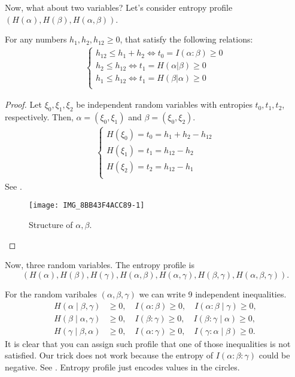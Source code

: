 Now, what about two variables?
Let's consider entropy profile $(H(\alpha), H(\beta), H(\alpha, \beta))$.
\begin{theorem}
	For any numbers $h_1, h_2, h_{12} \geq 0$, that satisfy the following relations:
	\begin{align*}
		\begin{cases}
			h_{12} \le  h_1 + h_2 \iff t_0 = I(\alpha : \beta) \ge 0 \\
			h_2 \le  h_{12} \iff t_1 = H(\alpha | \beta) \ge 0 \\
			h_1 \le  h_{12} \iff t_1 = H(\beta | \alpha) \ge 0 \\
		\end{cases}
	\end{align*}
\end{theorem}
\begin{proof}
	Let $\xi_0, \xi_1, \xi_2$ be independent random variables with entropies $t_0, t_1, t_2$, respectively.
	Then, $\alpha = (\xi_0, \xi_1)$ and $\beta = (\xi_0, \xi_2)$.
	\begin{align*}
		\begin{cases}
			H(\xi_0) = t_0 = h_1 + h_2 - h_{12} \\
			H(\xi_1) = t_1 = h_{12} - h_2 \\
			H(\xi_2) = t_2 = h_{12} - h_1 \\
		\end{cases}
	\end{align*}
	See .
	\begin{figure}[htpb]
		\centering
		\texttt{[image: IMG\_8BB43F4ACC89-1]}
		\caption{Structure of $\alpha, \beta$.}
		\label{fig:IMG_8BB43F4ACC89-1}
	\end{figure}
\end{proof}

Now, three random variables.
The entropy profile is 
\[(H(\alpha), H(\beta), H(\gamma), H(\alpha, \beta), H(\alpha, \gamma), H(\beta, \gamma), H(\alpha, \beta, \gamma)).\]

For the random varibales $(\alpha, \beta, \gamma)$ we can write 9 independent inequalities.
\begin{align*}
	H(\alpha  \mid  \beta, \gamma) &\ge 0, \quad I(\alpha : \beta) \ge  0, \quad I(\alpha : \beta  \mid  \gamma) \ge  0, \\
	H(\beta  \mid  \alpha, \gamma) &\ge 0, \quad I(\beta : \gamma) \ge  0, \quad I(\beta : \gamma  \mid  \alpha) \ge  0, \\
	H(\gamma  \mid  \beta, \alpha) &\ge 0, \quad I(\alpha : \gamma) \ge  0, \quad I(\gamma : \alpha  \mid  \beta) \ge  0.
\end{align*}
It is clear that you can assign such profile that one of those inequalities is not satisfied.
Our trick does not work because the entropy of $I(\alpha : \beta : \gamma)$ could be negative.
See .
Entropy profile just encodes values in the circles.

